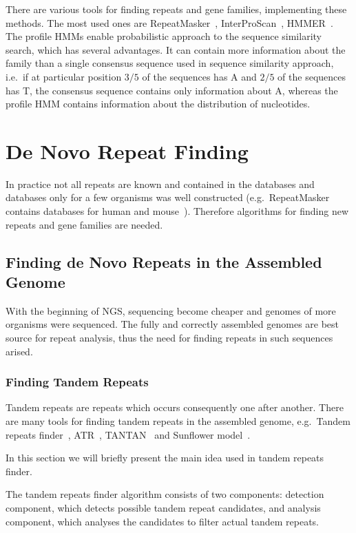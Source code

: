 There are various tools for finding repeats and gene families, implementing these methods.
The most used ones are RepeatMasker~\cite{repeatmasker}, InterProScan~\cite{mitchell2015interpro}, HMMER~\cite{eddy2011accelerated}.
The profile HMMs enable probabilistic approach to the sequence similarity search, which has several advantages. It can contain more information about the family than a single consensus sequence used in sequence similarity approach, i.e.\ if at particular position $3/5$ of the sequences has A and $2/5$ of the sequences has T, the consensus sequence contains only information about A, whereas the profile HMM contains information about the distribution of nucleotides.

\section{De Novo Repeat Finding}

In practice not all repeats are known and contained in the databases and databases only for a few organisms was well constructed (e.g.\ RepeatMasker contains databases for human and mouse~\cite{repeatmasker}). Therefore algorithms for finding new repeats and gene families are needed.

\subsection{Finding de Novo Repeats in the Assembled Genome}

With the beginning of NGS, sequencing become cheaper and genomes of more organisms were sequenced. The fully and correctly assembled genomes are best source for repeat analysis, thus the need for finding repeats in such sequences arised.

\subsubsection{Finding Tandem Repeats}
Tandem repeats are repeats which occurs consequently one after another. There are many tools for finding tandem repeats in the assembled genome, e.g.\ Tandem repeats finder~\cite{trf}, ATR~\cite{atr}, TANTAN~\cite{tantan} and Sunflower model~\cite{nanasi2014probabilistic}.

In this section we will briefly present the main idea used in tandem repeats finder.

The tandem repeats finder algorithm consists of two components: detection component, which detects possible tandem repeat candidates, and analysis component, which analyses the candidates to filter actual tandem repeats.

